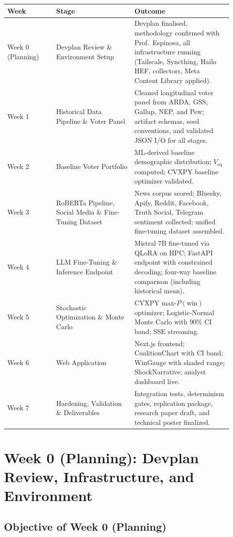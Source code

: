 \documentclass[11pt]{article}
\begin{document}
\begin{longtable}{%
  p{0.20\linewidth}%
  p{0.32\linewidth}%
  p{0.40\linewidth}}
\toprule
\textbf{Week} & \textbf{Stage} & \textbf{Outcome} \\
\midrule
\endhead
Week 0 (Planning) & Devplan Review \& Environment Setup
  & Devplan finalised, methodology confirmed with Prof.\ Espinosa,
    all infrastructure running (Tailscale, Syncthing, Hailo HEF,
    collectors, Meta Content Library applied). \\[4pt]
Week 1 & Historical Data Pipeline \& Voter Panel
  & Cleaned longitudinal voter panel from ARDA, GSS, Gallup, NEP, and Pew;
    artifact schemas, seed conventions, and validated JSON I/O for all stages. \\[4pt]
Week 2 & Baseline Voter Portfolio
  & ML-derived baseline demographic distribution; $V_{\text{eq}}$ computed;
    CVXPY baseline optimizer validated. \\[4pt]
Week 3 & RoBERTa Pipeline, Social Media \& Fine-Tuning Dataset
  & News corpus scored; Bluesky, Apify, Reddit, Facebook, Truth Social, Telegram
    sentiment collected; unified fine-tuning dataset assembled. \\[4pt]
Week 4 & LLM Fine-Tuning \& Inference Endpoint
  & Mistral 7B fine-tuned via QLoRA on HPC; FastAPI endpoint with constrained
    decoding; four-way baseline comparison (including historical mean). \\[4pt]
Week 5 & Stochastic Optimization \& Monte Carlo
  & CVXPY max-$P(\text{win})$ optimizer; Logistic-Normal Monte Carlo with
    90\% CI band; SSE streaming. \\[4pt]
Week 6 & Web Application
  & Next.js frontend; CoalitionChart with CI band; WinGauge with shaded range;
    ShockNarrative; analyst dashboard live. \\[4pt]
Week 7 & Hardening, Validation \& Deliverables
  & Integration tests, determinism gates, replication package,
    research paper draft, and technical poster finalized. \\
\bottomrule
\end{longtable}

\section{Week 0 (Planning): Devplan Review, Infrastructure, and Environment}

\subsection*{Objective of Week 0 (Planning)}
\end{document}
